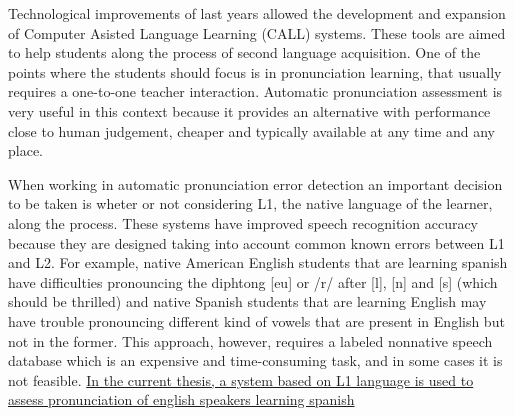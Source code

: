 
Technological improvements of last years allowed the development and expansion of Computer
Asisted Language Learning (CALL) systems. These tools are aimed to help students along the
process of second language acquisition. One of the points where the
students should focus is in pronunciation learning, that usually requires a one-to-one teacher
interaction. Automatic pronunciation assessment is very useful in this
context because it provides an alternative with performance close to human judgement,
cheaper and typically available at any time and any place.




When working in automatic pronunciation error detection an important decision to be taken is
wheter or not considering L1, the native language of the learner, along the process. These
systems have improved speech recognition accuracy because they are designed
taking into account common known errors between L1 and L2. For example, native American English
students that are learning spanish have difficulties pronouncing the diphtong [eu] or
/r/ after [l], [n] and [s] (which should be thrilled) and native Spanish students
that are learning English may have trouble pronouncing
different kind of vowels that are present in English
but not in the former. This approach, however, requires a labeled nonnative speech database
which is an expensive and time-consuming task, and in some cases it is not feasible.
\underline{In the current thesis, a system based on L1 language
is used to assess pronunciation
of english speakers learning spanish}


